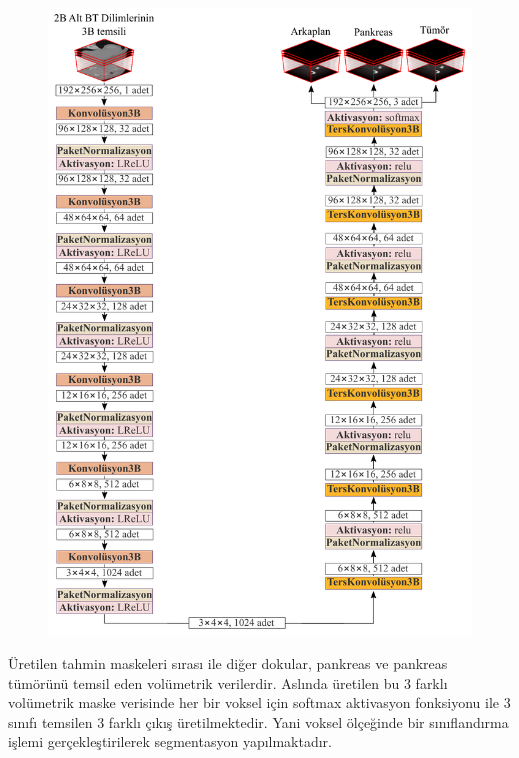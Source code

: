 \begin{figure}[h!]
	\begin{center}
		\vspace{0.4cm}
		{
			\vspace{0.4cm}
			\includegraphics[scale=0.6]{Yapilan-Calismalar/Figures/3dfcn.pdf}
		}
	\end{center}
\end{figure} 

Üretilen tahmin maskeleri sırası ile diğer dokular, pankreas ve pankreas tümörünü temsil eden volümetrik verilerdir. Aslında üretilen bu 3 farklı volümetrik maske verisinde her bir voksel için softmax aktivasyon fonksiyonu ile 3 sınıfı temsilen 3 farklı çıkış üretilmektedir. Yani voksel ölçeğinde bir sınıflandırma işlemi gerçekleştirilerek segmentasyon yapılmaktadır.


